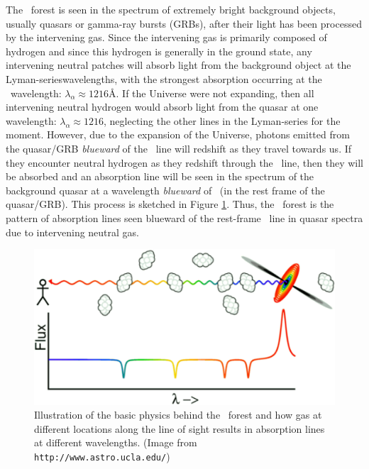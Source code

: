 The \lya\ forest is seen in the spectrum of extremely bright background objects, usually quasars  or gamma-ray bursts (GRBs), after their light has been processed by the intervening gas. Since the intervening gas is primarily composed of hydrogen and since this hydrogen is generally in the ground state, any intervening neutral patches will absorb light from the background object at the Lyman-serieswavelengths, with the strongest absorption occurring at the \lya\ wavelength: $\lambda_{\alpha} \approx 1216$\AA. If the Universe were not expanding, then all intervening neutral hydrogen would absorb light from the quasar at one wavelength: $\lambda_{\alpha} \approx 1216$\angstrom, neglecting the other lines in the Lyman-series for the moment. However, due to the expansion of the Universe, photons emitted from the quasar/GRB \textit{blueward} of the \lya\ line will redshift as they travel towards us. If they encounter neutral hydrogen as they redshift through the \lya\ line, then they will be absorbed and an absorption line will be seen in the spectrum of the background quasar at a wavelength \textit{blueward} of \lya\ (in the rest frame of the quasar/GRB). This process is sketched in Figure \ref{fig:LyaCartoon}. Thus, the \lya\ forest is the pattern of absorption lines seen blueward of the rest-frame \lya\ line in quasar spectra due to intervening neutral gas. 

\begin{figure}[h]
  \centering
  \includegraphics[width=12cm]{lyaf-75.eps}
  \caption{Illustration of the basic physics behind the \lya\ forest and how gas at different locations along the line of sight results in absorption lines at different wavelengths. (Image from {\tt http://www.astro.ucla.edu/})}
  \label{fig:LyaCartoon}
\end{figure}

